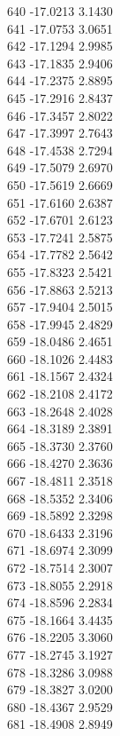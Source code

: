 \documentclass[11pt]{article}
\theoremstyle{definition}
\theoremstyle{plain}
\begin{document}
{640 -17.0213 3.1430\\
641 -17.0753 3.0651\\
642 -17.1294 2.9985\\
643 -17.1835 2.9406\\
644 -17.2375 2.8895\\
645 -17.2916 2.8437\\
646 -17.3457 2.8022\\
647 -17.3997 2.7643\\
648 -17.4538 2.7294\\
649 -17.5079 2.6970\\
650 -17.5619 2.6669\\
651 -17.6160 2.6387\\
652 -17.6701 2.6123\\
653 -17.7241 2.5875\\
654 -17.7782 2.5642\\
655 -17.8323 2.5421\\
656 -17.8863 2.5213\\
657 -17.9404 2.5015\\
658 -17.9945 2.4829\\
659 -18.0486 2.4651\\
660 -18.1026 2.4483\\
661 -18.1567 2.4324\\
662 -18.2108 2.4172\\
663 -18.2648 2.4028\\
664 -18.3189 2.3891\\
665 -18.3730 2.3760\\
666 -18.4270 2.3636\\
667 -18.4811 2.3518\\
668 -18.5352 2.3406\\
669 -18.5892 2.3298\\
670 -18.6433 2.3196\\
671 -18.6974 2.3099\\
672 -18.7514 2.3007\\
673 -18.8055 2.2918\\
674 -18.8596 2.2834\\
675 -18.1664 3.4435\\
676 -18.2205 3.3060\\
677 -18.2745 3.1927\\
678 -18.3286 3.0988\\
679 -18.3827 3.0200\\
680 -18.4367 2.9529\\
681 -18.4908 2.8949\\
}
\end{document}

